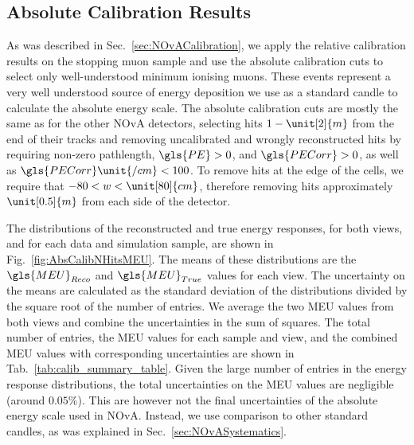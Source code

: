 \newpage

\subsection{Absolute Calibration Results}
As was described in Sec.~\ref{sec:NOvACalibration}, we apply the relative calibration results on the stopping muon sample and use the absolute calibration cuts to select only well-understood minimum ionising muons. These events represent a very well understood source of energy deposition we use as a standard candle to calculate the absolute energy scale. The absolute calibration cuts are mostly the same as for the other \gls{NOvA} detectors, selecting hits $1-\unit[2]{m}$ from the end of their tracks and removing uncalibrated and wrongly reconstructed hits by requiring non-zero pathlength, $\gls{PE}>0$, and $\gls{PECorr} > 0$, as well as $\gls{PECorr}\unit{/cm} < 100$. To remove hits at the edge of the cells, we require that $-80<w<\unit[80]{cm}$, therefore removing hits approximately $\unit[0.5]{m}$ from each side of the detector.

The distributions of the reconstructed and true energy responses, for both views, and for each data and simulation sample, are shown in Fig.~\ref{fig:AbsCalibNHitsMEU}. The means of these distributions are the $\gls{MEU}_{Reco}$ and $\gls{MEU}_{True}$ values for each view. The uncertainty on the means are calculated as the standard deviation of the distributions divided by the square root of the number of entries. We average the two \gls{MEU} values from both views and combine the uncertainties in the sum of squares. The total number of entries, the \gls{MEU} values for each sample and view, and the combined \gls{MEU} values with corresponding uncertainties are shown in Tab.~\ref{tab:calib_summary_table}. Given the large number of entries in the energy response distributions, the total uncertainties on the \gls{MEU} values are negligible (around $0.05\%$). This are however not the final uncertainties of the absolute energy scale used in \gls{NOvA}. Instead, we use comparison to other standard candles, as was explained in Sec.~\ref{sec:NOvASystematics}.

